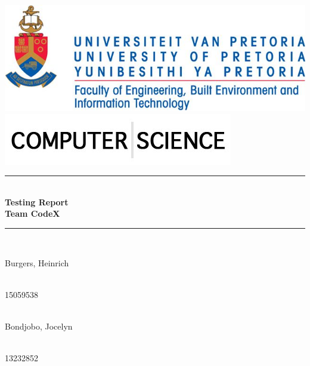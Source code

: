 \begin{titlepage}
	\begin{center}
		\includegraphics[width=0.7\linewidth]{uniLogo.jpg}\\[1cm]
		\includegraphics[width=0.7\linewidth]{headerCS.jpg}\\[1cm]  
		\rule{\linewidth}{0.5mm} \\[1cm]
		{ \huge \bfseries  Testing Report \\\textbf{Team  CodeX}}\\[0.5cm]
		\rule{\linewidth}{0.5mm} \\[1cm] 			
		  
		  
		\begin{minipage}{0.4\textwidth}
			\begin{flushleft} \large
				 Burgers, Heinrich
			\end{flushleft}
		\end{minipage}
		\begin{minipage}{0.4\textwidth}
			\begin{flushright} \large
				\emph{} \\
				15059538
			\end{flushright}
		\end{minipage}
		
		
		\begin{minipage}{0.4\textwidth}
			\begin{flushleft} \large
				\emph{} \\
				Bondjobo, Jocelyn  
			\end{flushleft}
		\end{minipage}
		\begin{minipage}{0.4\textwidth}
			\begin{flushright} \large
				\emph{} \\
				13232852
			\end{flushright}
		\end{minipage}
		

\end{center}
\end{titlepage}
